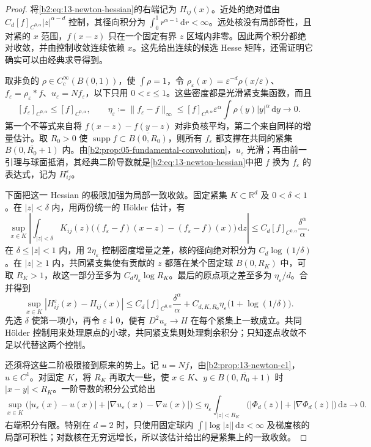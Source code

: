 \begin{proof}
将\eqref{b2:eq:13-newton-hessian}的右端记为 \(H_{ij}(x)\)。近处的绝对值由 \(C_d[f]_{C^{0,\alpha}}|z|^{\alpha-d}\) 控制，其径向积分为 \(\int_0^1r^{\alpha-1}\,\mathrm{d}r<\infty\)。远处核没有局部奇性，且对紧的 \(x\) 范围，\(f(x-z)\) 只在一个固定有界 \(z\) 区域内非零。因此两个积分都绝对收敛，并由控制收敛连续依赖 \(x\)。这先给出连续的候选 Hesse 矩阵，还需证明它确实可以由经典求导得到。

取非负的 \(\rho\in C_c^\infty(B(0,1))\)，使 \(\int\rho=1\)，令 \(\rho_\varepsilon(x)=\varepsilon^{-d}\rho(x/\varepsilon)\)、\(f_\varepsilon=\rho_\varepsilon*f\)、\(u_\varepsilon=Nf_\varepsilon\)，以下只用 \(0<\varepsilon\leq1\)。这些密度都是光滑紧支集函数，而且
\[
 [f_\varepsilon]_{C^{0,\alpha}}\leq[f]_{C^{0,\alpha}},\qquad
 \eta_\varepsilon\coloneqq\|f_\varepsilon-f\|_\infty
 \leq [f]_{C^{0,\alpha}}\varepsilon^\alpha
             \int\rho(y)|y|^\alpha\,\mathrm{d}y\longrightarrow0.
\]
第一个不等式来自将 \(f(x-z)-f(y-z)\) 对非负核平均，第二个来自同样的增量估计。取 \(R_0>0\) 使 \(\operatorname{supp}f\subset\overline{B(0,R_0)}\)，则所有 \(f_\varepsilon\) 都支撑在共同的紧集 \(\overline{B(0,R_0+1)}\) 内。由\cref{b2:prop:05-fundamental-convolution}，\(u_\varepsilon\) 光滑；再由前一引理与球面抵消，其经典二阶导数就是\eqref{b2:eq:13-newton-hessian}中把 \(f\) 换为 \(f_\varepsilon\) 的表达式，记为 \(H_{ij}^\varepsilon\)。

下面把这一 Hessian 的极限加强为局部一致收敛。固定紧集 \(K\subset\mathbb R^d\) 及 \(0<\delta<1\)。在 \(|z|<\delta\) 内，用两份统一的 Hölder 估计，有
\[
 \sup_{x\in K}\left|\int_{|z|<\delta}K_{ij}(z)
 \bigl((f_\varepsilon-f)(x-z)-(f_\varepsilon-f)(x)\bigr)\,\mathrm{d}z\right|
 \leq C_d[f]_{C^{0,\alpha}}\frac{\delta^\alpha}{\alpha}.
\]
在 \(\delta\leq|z|<1\) 内，用 \(2\eta_\varepsilon\) 控制密度增量之差，核的径向绝对积分为 \(C_d\log(1/\delta)\)。在 \(|z|\geq1\) 内，共同紧支集使有贡献的 \(z\) 都落在某个固定球 \(B(0,R_K)\) 中，可取 \(R_K>1\)，故这一部分至多为 \(C_d\eta_\varepsilon\log R_K\)。最后的原点项之差至多为 \(\eta_\varepsilon/d\)。合并得到
\[
 \sup_{x\in K}|H_{ij}^\varepsilon(x)-H_{ij}(x)|
 \leq C_d[f]_{C^{0,\alpha}}\frac{\delta^\alpha}{\alpha}
       +C_{d,K,R_0}\eta_\varepsilon\bigl(1+\log(1/\delta)\bigr).
\]
先选 \(\delta\) 使第一项小，再令 \(\varepsilon\downarrow0\)，便有 \(D^2u_\varepsilon\to H\) 在每个紧集上一致成立。共同 Hölder 控制用来处理原点的小球，共同紧支集则处理剩余积分；只知逐点收敛不足以代替这两个控制。

还须将这些二阶极限接到原来的势上。记 \(u=Nf\)，由\cref{b2:prop:13-newton-c1}，\(u\in C^1\)。对固定 \(K\)，将 \(R_K\) 再取大一些，使 \(x\in K\)、\(y\in\overline{B(0,R_0+1)}\) 时 \(|x-y|<R_K\)。一阶导数的积分公式给出
\[
 \sup_{x\in K}\bigl(|u_\varepsilon(x)-u(x)|
             +|\nabla u_\varepsilon(x)-\nabla u(x)|\bigr)
 \leq \eta_\varepsilon\int_{|z|<R_K}
                    \bigl(|\Phi_d(z)|+|\nabla\Phi_d(z)|\bigr)\,\mathrm{d}z
 \longrightarrow0.
\]
右端积分有限。特别在 \(d=2\) 时，只使用固定球内 \(\int|\log|z||\,\mathrm{d}z<\infty\) 及梯度核的局部可积性；对数核在无穷远增长，所以该估计给出的是紧集上的一致收敛。


\end{proof}
